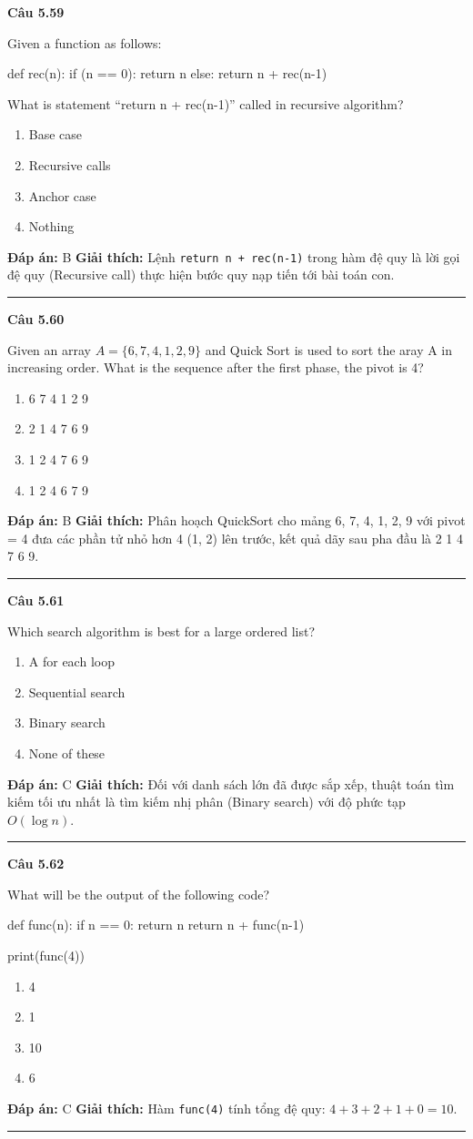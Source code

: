 \documentclass[11pt,a4paper]{article}
\newenvironment{question}[1]{%
  \par\vspace{1em}\noindent\textbf{\large Câu #1}\par\vspace{0.4em}
}{%
  \par\vspace{1em}\hrule\vspace{0.6em}
}
\newenvironment{choices}{%
  \begin{enumerate}[label=\textbf{\Alph*.},leftmargin=2.2em,itemsep=2pt,topsep=3pt]
}{%
  \end{enumerate}
}
\newcommand{\choice}{\item}
\newenvironment{codebox}{%
  \begin{tcolorbox}[colback=gray!8!white,colframe=gray!50!black,arc=1.5mm,boxrule=0.6pt,left=3mm,right=3mm,top=2.5mm,bottom=2.5mm]
  \ttfamily\small
}{%
  \end{tcolorbox}
}
\begin{document}
\begin{question}{5.59}
Given a function as follows:
\begin{codebox}
def rec(n):
    if (n == 0):
        return n
    else:
        return n + rec(n-1)
\end{codebox}
What is statement ``return n + rec(n-1)'' called in recursive algorithm?
\begin{choices}
\choice Base case
\choice Recursive calls
\choice Anchor case
\choice Nothing
\end{choices}
\textbf{Đáp án:} B
\textbf{Giải thích:} Lệnh \texttt{return n + rec(n-1)} trong hàm đệ quy là lời gọi đệ quy (Recursive call) thực hiện bước quy nạp tiến tới bài toán con.
\end{question}

\begin{question}{5.60}
Given an array $A = \{6, 7, 4, 1, 2, 9\}$ and Quick Sort is used to sort the aray A in increasing order. What is the sequence after the first phase, the pivot is 4?
\begin{choices}
\choice 6 7 4 1 2 9
\choice 2 1 4 7 6 9
\choice 1 2 4 7 6 9
\choice 1 2 4 6 7 9
\end{choices}
\textbf{Đáp án:} B
\textbf{Giải thích:} Phân hoạch QuickSort cho mảng {6, 7, 4, 1, 2, 9} với pivot = 4 đưa các phần tử nhỏ hơn 4 ({1, 2}) lên trước, kết quả dãy sau pha đầu là 2 1 4 7 6 9.
\end{question}

\begin{question}{5.61}
Which search algorithm is best for a large ordered list?
\begin{choices}
\choice A for each loop
\choice Sequential search
\choice Binary search
\choice None of these
\end{choices}
\textbf{Đáp án:} C
\textbf{Giải thích:} Đối với danh sách lớn đã được sắp xếp, thuật toán tìm kiếm tối ưu nhất là tìm kiếm nhị phân (Binary search) với độ phức tạp $O(\log n)$.
\end{question}

\begin{question}{5.62}
What will be the output of the following code?
\begin{codebox}
def func(n):
    if n == 0:
        return n
    return n + func(n-1)

print(func(4))
\end{codebox}
\begin{choices}
\choice 4
\choice 1
\choice 10
\choice 6
\end{choices}
\textbf{Đáp án:} C
\textbf{Giải thích:} Hàm \texttt{func(4)} tính tổng đệ quy: $4 + 3 + 2 + 1 + 0 = 10$.
\end{question}
\end{document}
